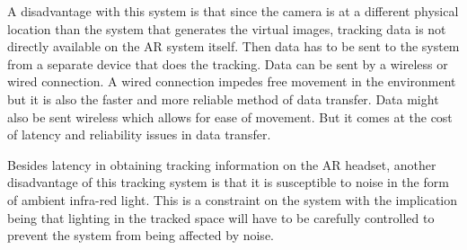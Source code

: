 A disadvantage with this system is that since the camera is at a different physical location than the system that generates the virtual images, tracking data is not directly available on the AR system itself. Then data has to be sent to the system from a separate device that does the tracking. Data can be sent by a wireless or wired connection. A wired connection impedes free movement in the environment but it is also the faster and more reliable method of data transfer. Data might also be sent wireless which allows for ease of movement. But it comes at the cost of latency and reliability issues in data transfer. 

Besides latency in obtaining tracking information on the AR headset, another disadvantage of this tracking system is that it is susceptible to noise in the form of ambient infra-red light. This is a constraint on the system with the implication being that lighting in the tracked space will have to be carefully controlled to prevent the system from being affected by noise.
